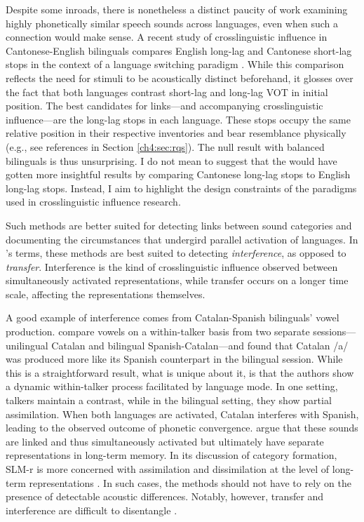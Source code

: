 Despite some inroads, there is nonetheless a distinct paucity of work examining highly phonetically similar speech sounds across languages, even when such a connection would make sense. A recent study of crosslinguistic influence in Cantonese-English bilinguals compares English long-lag and Cantonese short-lag stops in the context of a language switching paradigm \citep{tsui_2019_switching}. While this comparison reflects the need for stimuli to be acoustically distinct beforehand, it glosses over the fact that both languages contrast short-lag and long-lag VOT in initial position. The best candidates for links---and accompanying crosslinguistic influence---are the long-lag stops in each language. These stops occupy the same relative position in their respective inventories and bear resemblance physically (e.g., see references in Section \ref{ch4:sec:rqs}). The null result with balanced bilinguals is thus unsurprising. I do not mean to suggest that the \citep{tsui_2019_switching} would have gotten more insightful results by comparing Cantonese long-lag stops to English long-lag stops. Instead, I aim to highlight the design constraints of the paradigms used in crosslinguistic influence research. 

Such methods are better suited for detecting links between sound categories and documenting the circumstances that undergird parallel activation of languages. In \citeauthor{grosjean_2011_transfer}'s \citeyearpar{grosjean_2011_transfer} terms, these methods are best suited to detecting \textit{interference}, as opposed to \textit{transfer}. Interference is the kind of crosslinguistic influence observed between simultaneously activated representations, while transfer occurs on a longer time scale, affecting the representations themselves. 

A good example of interference comes from Catalan-Spanish bilinguals' vowel production. \citet{simonet_2019_convergence} compare vowels on a within-talker basis from two separate sessions---unilingual Catalan and bilingual Spanish-Catalan---and found that Catalan /a/ was produced more like its Spanish counterpart in the bilingual session. While this is a straightforward result, what is unique about it, is that the authors show a dynamic within-talker process facilitated by language mode. In one setting, talkers maintain a contrast, while in the bilingual setting, they show partial assimilation. When both languages are activated, Catalan interferes with Spanish, leading to the observed outcome of phonetic convergence. \citet{simonet_2019_convergence} argue that these sounds are linked and thus simultaneously activated but ultimately have separate representations in long-term memory. In its discussion of category formation, SLM-r is more concerned with assimilation and dissimilation at the level of long-term representations \citep[i.e., transfer][]{flege_2021_slmr}. In such cases, the methods should not have to rely on the presence of detectable acoustic differences. Notably, however, transfer and interference are difficult to disentangle \citep{grosjean_2011_transfer}. 

